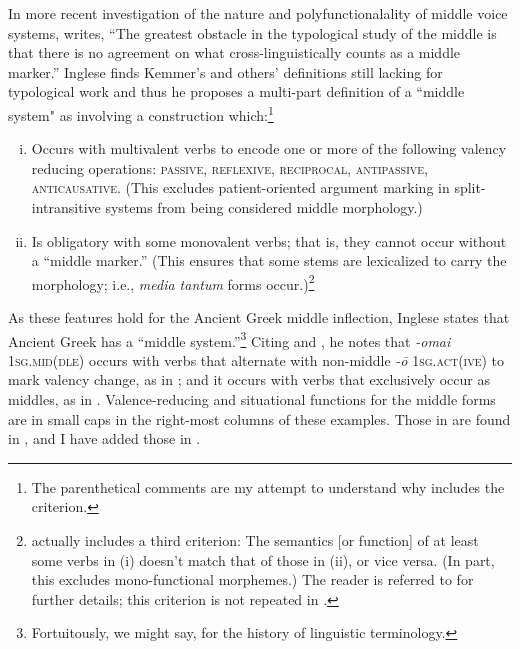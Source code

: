 \documentclass[output=paper,colorlinks,citecolor=brown
]{langscibook}
\begin{document}
In more recent investigation of the nature and polyfunctionalality of middle voice systems, \citet[490]{Inglese2022b} writes, “The greatest obstacle in the typological study of the middle is that there is no agreement on what cross-linguistically counts as a middle marker.” Inglese finds Kemmer's and others' definitions still lacking for typological work and thus he proposes a multi-part definition of a ``middle system" as involving a construction which:\footnote{The parenthetical comments are my attempt to understand why \citet{Inglese2022a} includes the criterion.} 
\begin{enumerate}[(i)]
\item Occurs with multivalent verbs to encode one or more of the following valency reducing operations: \textsc{passive, reflexive, reciprocal, antipassive, anticausative}. (This excludes patient-oriented argument marking in split-intransitive systems from being considered middle morphology.) 
\item Is obligatory with some monovalent verbs; that is, they cannot occur without a ``middle marker.” (This ensures that some stems are lexicalized to carry the morphology; i.e., \textit{media tantum} forms occur.)\footnote{\citet{Inglese2022a} actually includes a third criterion:  The semantics [or function] of at least some verbs in (i) doesn’t match that of those in (ii), or vice versa. (In part, this excludes mono-functional morphemes.) The reader is referred to \citet{Inglese2022a} for further details; this criterion is not repeated in \citet{Inglese2023}.}
\end{enumerate}

\noindent As these features hold for the Ancient Greek middle inflection, Inglese states that Ancient Greek has a ``middle system.”\footnote{Fortuitously, we might say, for the history of linguistic terminology.} Citing \citet[417-425]{Delbruck1897} and \citet[431-432]{Romagno2010}, he notes that  \textit{-omai} \textsc{1sg.mid(dle)} occurs with verbs that alternate with non-middle \textit{-ō} \textsc{1sg.act(ive)} to mark valency change, as in ; and it occurs with verbs that exclusively occur as middles, as in . Valence-reducing and situational functions for the middle forms are in small caps in the right-most columns of these examples. Those in  are found in \citet[490]{Inglese2022a}, and I have added those in  .

\end{document}
